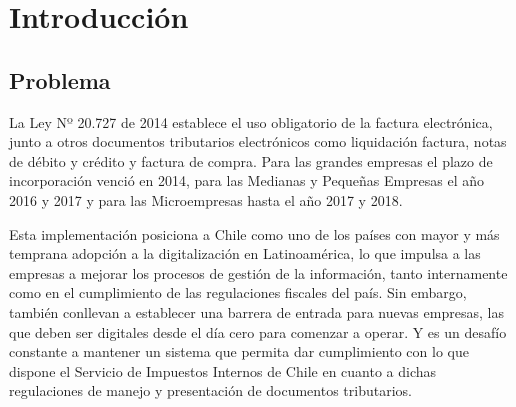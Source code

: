 \chapter{Introducción}

\section{Problema}

La Ley Nº 20.727 de 2014 establece el uso obligatorio de la factura electrónica, junto a otros documentos tributarios electrónicos como liquidación factura, notas de débito y crédito y factura de compra. Para las grandes empresas el plazo de incorporación venció en 2014, para las Medianas y Pequeñas Empresas el año 2016 y 2017 y para las Microempresas hasta el año 2017 y 2018.

Esta implementación posiciona a Chile como uno de los países con mayor y más temprana adopción a la digitalización en Latinoamérica, lo que impulsa a las empresas a mejorar los procesos de gestión de la información, tanto internamente como en el cumplimiento de las regulaciones fiscales del país. Sin embargo, también conllevan a establecer una barrera de entrada para nuevas empresas, las que deben ser digitales desde el día cero para comenzar a operar. Y es un desafío constante a mantener un sistema que permita dar cumplimiento con lo que dispone el Servicio de Impuestos Internos de Chile en cuanto a dichas regulaciones de manejo y presentación de documentos tributarios.

